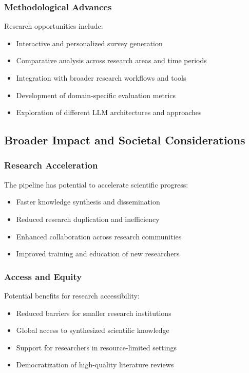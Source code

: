 \subsubsection{Methodological Advances}

Research opportunities include:
\begin{itemize}
    \item Interactive and personalized survey generation
    \item Comparative analysis across research areas and time periods
    \item Integration with broader research workflows and tools
    \item Development of domain-specific evaluation metrics
    \item Exploration of different LLM architectures and approaches
\end{itemize}

\subsection{Broader Impact and Societal Considerations}

\subsubsection{Research Acceleration}

The pipeline has potential to accelerate scientific progress:
\begin{itemize}
    \item Faster knowledge synthesis and dissemination
    \item Reduced research duplication and inefficiency
    \item Enhanced collaboration across research communities
    \item Improved training and education of new researchers
\end{itemize}

\subsubsection{Access and Equity}

Potential benefits for research accessibility:
\begin{itemize}
    \item Reduced barriers for smaller research institutions
    \item Global access to synthesized scientific knowledge
    \item Support for researchers in resource-limited settings
    \item Democratization of high-quality literature reviews
\end{itemize}

